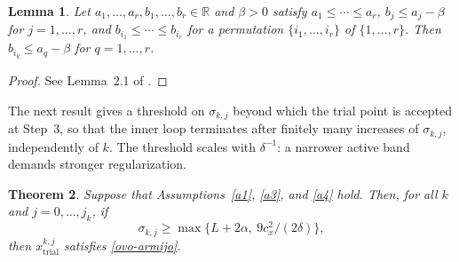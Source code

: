 \documentclass[11pt]{article}
\newcommand{\xkjtrial}{x^{k,j}_{\mathrm{trial}}}
\newtheorem{theorem}{Theorem}[section]
\newtheorem{lemma}[theorem]{Lemma}
\begin{document}
\begin{lemma} \label{lem1}
Let $a_1, \ldots, a_r, b_1, \ldots, b_r \in \mathbb{R}$ and $\beta > 0$ satisfy
$a_1 \leq \cdots \leq a_r$, $b_j \leq a_j - \beta$ for $j = 1, \ldots, r$, and
$b_{i_1} \leq \cdots \leq b_{i_r}$ for a permutation $\{i_1, \ldots, i_r\}$ of
$\{1, \ldots, r\}$. Then $b_{i_q} \leq a_q - \beta$ for $q = 1, \ldots, r$.
\end{lemma}

\begin{proof}
See Lemma~2.1 of \cite{dunder1}.
\end{proof}

The next result gives a threshold on $\sigma_{k,j}$ beyond which the trial point
is accepted at Step~3, so that the inner loop terminates after finitely many
increases of $\sigma_{k,j}$, independently of $k$. The threshold scales with
$\delta^{-1}$: a narrower active band demands stronger regularization.

\begin{theorem} \label{teo:suff-descent}
Suppose that Assumptions~\ref{a1}, \ref{a3}, and \ref{a4} hold. Then, for all
$k$ and $j = 0, \ldots, j_k$, if
\begin{equation} \label{este}
\sigma_{k,j} \geq \max\{ L + 2\alpha,\ 9c_x^2/(2\delta) \},
\end{equation}
then $\xkjtrial$ satisfies \eqref{ovo-armijo}.
\end{theorem}
\end{document}
